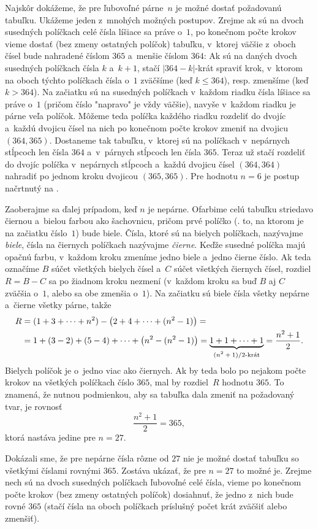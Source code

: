 {%
Najskôr dokážeme, že pre ľubovoľné párne~$n$ je možné dostať požadovanú tabuľku. Ukážeme jeden z~mnohých možných postupov. Zrejme ak sú na dvoch susedných políčkach celé čísla líšiace sa práve o~$1$, po konečnom počte krokov vieme dostať (bez zmeny ostatných políčok) tabuľku, v~ktorej väčšie z~oboch čísel bude nahradené číslom $365$ a~menšie číslom $364$: Ak sú na daných dvoch susedných políčkach čísla $k$ a~$k+1$, stačí $|364-k|$-krát spraviť krok, v~ktorom na oboch týchto políčkach čísla o~$1$ zväčšíme (keď $k\le364$), resp. zmenšíme (keď $k>364$). Na začiatku sú na susedných políčkach v~každom riadku čísla líšiace sa práve o~$1$ (pričom číslo "napravo" je vždy väčšie), navyše v~každom riadku je párne veľa políčok. Môžeme teda políčka každého riadku rozdeliť do dvojíc a~každú dvojicu čísel na nich po konečnom počte krokov zmeniť na dvojicu $(364,365)$. Dostaneme tak tabuľku, v~ktorej sú na políčkach v~nepárnych stĺpcoch len čísla $364$ a~v~párnych stĺpcoch len čísla $365$. Teraz už stačí rozdeliť do dvojíc políčka v~nepárnych stĺpcoch a~každú dvojicu čísel $(364,364)$ nahradiť po jednom kroku dvojicou $(365,365)$. Pre hodnotu $n=6$ je postup načrtnutý na \obr.

\smallskip
Zaoberajme sa ďalej prípadom, keď $n$ je nepárne. Ofarbime celú tabuľku striedavo čiernou a~bielou farbou ako šachovnicu, pričom prvé políčko (\tj. to, na ktorom je na začiatku číslo~$1$) bude biele. Čísla, ktoré sú na bielych políčkach, nazývajme {\it biele}, čísla na čiernych políčkach nazývajme {\it čierne}. Keďže susedné políčka majú opačnú farbu, v~každom kroku zmeníme jedno biele a~jedno čierne číslo. Ak teda označíme $B$ súčet všetkých bielych čísel a~$C$ súčet všetkých čiernych čísel, rozdiel $R=B-C$ sa po žiadnom kroku nezmení (v~každom kroku sa buď $B$ aj $C$ zväčšia o~$1$, alebo sa obe zmenšia o~$1$). Na začiatku sú biele čísla všetky nepárne a~čierne všetky párne, takže
$$
\aligned
 R&=(1+3+\cdots+n^2)-\bigl(2+4+\cdots+(n^2-1)\bigr)=\\
  &=1+(3-2)+(5-4)+\cdots+\bigl(n^2-(n^2-1)\bigr)=\underbrace{1+1+\cdots+1}_{\text{$(n^2+1)/2$-krát}}=\frac{n^2+1}2.
\endaligned
$$
Bielych políčok je o~jedno viac ako čiernych. Ak by teda bolo po nejakom počte krokov na všetkých políčkach číslo $365$, mal by rozdiel~$R$ hodnotu $365$. To znamená, že nutnou podmienkou, aby sa tabuľka dala zmeniť na požadovaný tvar, je rovnosť
$$
  \frac{n^2+1}2=365,
$$
ktorá nastáva jedine pre $n=27$.

\smallskip
Dokázali sme, že pre nepárne čísla rôzne od $27$ nie je možné dostať tabuľku so všetkými číslami rovnými $365$. Zostáva ukázať, že pre $n=27$ to možné je. Zrejme nech sú na dvoch susedných políčkach ľubovoľné celé čísla, vieme po konečnom počte krokov (bez zmeny ostatných políčok) dosiahnuť, že jedno z~nich bude rovné $365$ (stačí čísla na oboch políčkach príslušný počet krát zväčšiť alebo zmenšiť).

}
